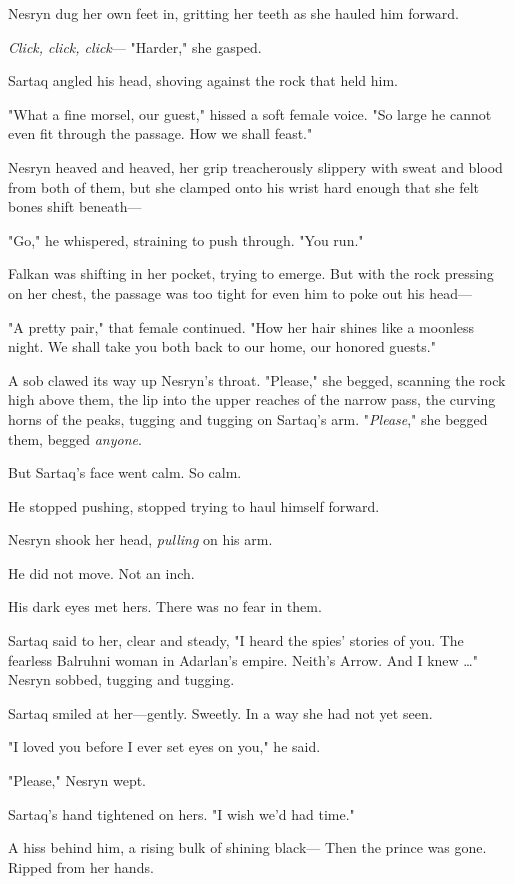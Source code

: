 Nesryn dug her own feet in, gritting her teeth as she hauled him forward.

\emph{Click, click, click}--- "Harder," she gasped.

Sartaq angled his head, shoving against the rock that held him.

"What a fine morsel, our guest," hissed a soft female voice.
"So large he cannot even fit through the passage.
How we shall feast."

Nesryn heaved and heaved, her grip treacherously slippery with sweat and blood from both of them, but she clamped onto his wrist hard enough that she felt bones shift beneath---

"Go," he whispered, straining to push through.
"You run."

Falkan was shifting in her pocket, trying to emerge.
But with the rock pressing on her chest, the passage was too tight for even him to poke out his head---

"A pretty pair," that female continued.
"How her hair shines like a moonless night.
We shall take you both back to our home, our honored guests."

A sob clawed its way up Nesryn's throat.
"Please," she begged, scanning the rock high above them, the lip into the upper reaches of the narrow pass, the curving horns of the peaks, tugging and tugging on Sartaq's arm.
"\emph{Please}," she begged them, begged \emph{anyone}.

But Sartaq's face went calm.
So calm.

He stopped pushing, stopped trying to haul himself forward.

Nesryn shook her head, \emph{pulling} on his arm.

He did not move.
Not an inch.

His dark eyes met hers.
There was no fear in them.

Sartaq said to her, clear and steady, "I heard the spies' stories of you.
The fearless Balruhni woman in Adarlan's empire.
Neith's Arrow.
And I knew \ldots" Nesryn sobbed, tugging and tugging.

Sartaq smiled at her---gently.
Sweetly.
In a way she had not yet seen.

"I loved you before I ever set eyes on you," he said.

"Please," Nesryn wept.

Sartaq's hand tightened on hers.
"I wish we'd had time."

A hiss behind him, a rising bulk of shining black--- Then the prince was gone.
Ripped from her hands.

